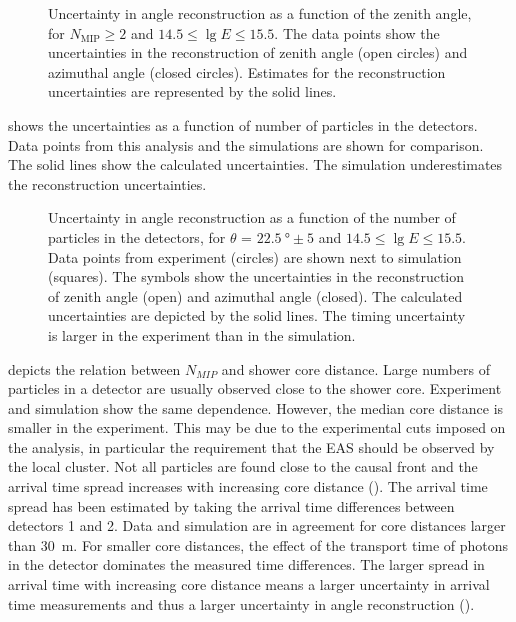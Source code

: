 \begin{figure}
\centering

\caption{Uncertainty in angle reconstruction as a function of the zenith
angle, for $N_\mathrm{MIP} \geq 2$ and $14.5 \leq \lg E \leq 15.5$.  The
data points show the uncertainties in the reconstruction of zenith angle
(open circles) and azimuthal angle (closed circles).  Estimates for the
reconstruction uncertainties are represented by the solid lines.}
\label{fig:results-zenith}
\end{figure}

 shows the
uncertainties as a function of number of particles in the \hisparc
detectors.  Data points from this analysis and the simulations are shown
for comparison.  The solid lines show the calculated uncertainties.  The
simulation underestimates the reconstruction uncertainties.

\begin{figure}
\centering

\caption{Uncertainty in angle reconstruction as a function of the number
of particles in the \hisparc detectors, for $\theta$ = $\SI{22.5}{\degree}
\pm 5$ and $14.5 \leq \lg E \leq 15.5$.  Data points from experiment
(circles) are shown next to simulation (squares). The symbols show the
uncertainties in the reconstruction of zenith angle (open) and azimuthal
angle (closed). The calculated uncertainties are depicted by the solid
lines. The timing uncertainty is larger in the experiment than in the
simulation.}
\label{fig:results-mip}
\end{figure}

 depicts the relation between $N_{MIP}$ and shower
core distance.  Large numbers of particles in a detector are usually observed
close to the shower core.  Experiment and simulation show the same dependence.
However, the median core distance is smaller in the experiment. This may be due
to the experimental cuts imposed on the \kascade analysis, in particular the
requirement that the EAS should be observed by the local cluster. Not all
particles are found close to the causal front and the arrival time spread
increases with increasing core distance
().  The arrival time spread has been
estimated by taking the arrival time differences between detectors 1 and 2. Data
and simulation are in agreement for core distances larger than \SI{30}{\meter}.
For smaller core distances, the effect of the transport time of photons in the
detector dominates the measured time differences. The larger spread in arrival
time with increasing core distance means a larger uncertainty in arrival time
measurements and thus a larger uncertainty in angle reconstruction
().

